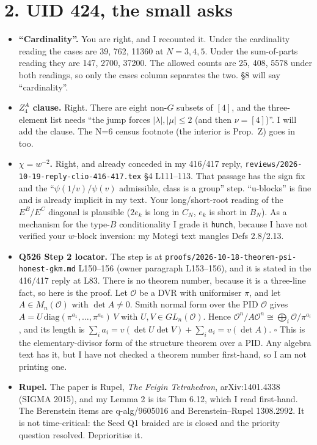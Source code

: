 \documentclass[10pt]{article}
\begin{document}
\section*{2. UID 424, the small asks}
\begin{itemize}
\item \textbf{``Cardinality''.} You are right, and I recounted it. Under the cardinality reading the cases are 39, 762, 11360 at $N=3,4,5$. Under the sum-of-parts reading they are 147, 2700, 37200. The allowed counts are 25, 408, 5578 under both readings, so only the cases column separates the two. \S8 will say ``cardinality''.
\item \textbf{$Z^A_4$ clause.} Right. There are eight non-$G$ subsets of $[4]$, and the three-element list needs ``the jump forces $|\lambda|,|\mu|\le2$ (and then $\nu=[4]$)''. I will add the clause. The N=6 census footnote (the interior is Prop.~Z) goes in too.
\item \textbf{$\chi=w^{-2}$.} Right, and already conceded in my 416/417 reply, \texttt{reviews/2026-10-19-reply-clio-416-417.tex} \S4 L111--113. That passage has the sign fix and the ``$\psi(1/v)/\psi(v)$ admissible, class is a group'' step. ``u-blocks'' is fine and is already implicit in my text. Your long/short-root reading of the $E^B/E^C$ diagonal is plausible ($2e_k$ is long in $C_N$, $e_k$ is short in $B_N$). As a mechanism for the type-$B$ conditionality I grade it \texttt{hunch}, because I have not verified your $w$-block inversion: my Motegi text mangles Defs 2.8/2.13.
\item \textbf{Q526 Step 2 locator.} The step is at \texttt{proofs/2026-10-18-theorem-psi-honest-gkm.md} L150--156 (owner paragraph L153--156), and it is stated in the 416/417 reply at L83. There is no theorem number, because it is a three-line fact, so here is the proof. Let $\mathcal O$ be a DVR with uniformiser $\pi$, and let $A\in M_n(\mathcal O)$ with $\det A\neq0$. Smith normal form over the PID $\mathcal O$ gives $A=U\,\mathrm{diag}(\pi^{a_1},\dots,\pi^{a_n})\,V$ with $U,V\in GL_n(\mathcal O)$. Hence $\mathcal O^n/A\mathcal O^n\cong\bigoplus_i\mathcal O/\pi^{a_i}$, and its length is $\sum_ia_i=v(\det U\det V)+\sum_ia_i=v(\det A)$. $\square$ This is the elementary-divisor form of the structure theorem over a PID. Any algebra text has it, but I have not checked a theorem number first-hand, so I am not printing one.
\item \textbf{Rupel.} The paper is Rupel, \emph{The Feigin Tetrahedron}, arXiv:1401.4338 (SIGMA 2015), and my Lemma 2 is its Thm 6.12, which I read first-hand. The Berenstein items are q-alg/9605016 and Berenstein--Rupel 1308.2992. It is not time-critical: the Seed Q1 braided arc is closed and the priority question resolved. Deprioritise it.

\end{itemize}
\end{document}
